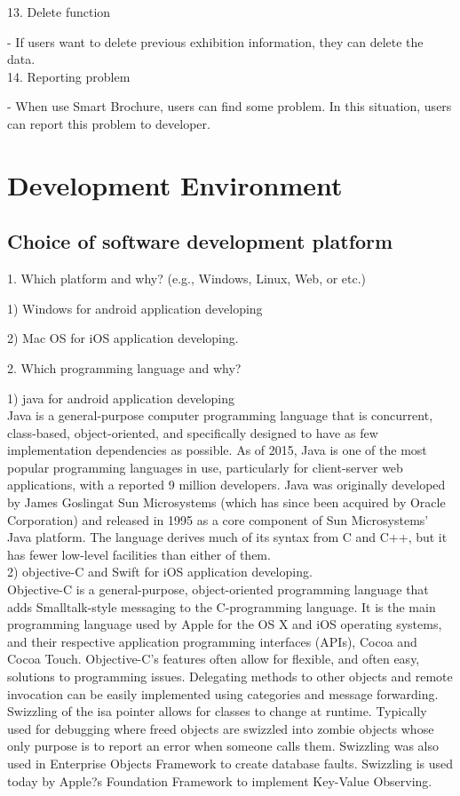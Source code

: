 \documentclass[conference]{IEEEtran}
\begin{document}
13. Delete function

\quad - If users want to delete previous exhibition information, they can delete the data.\\

14. Reporting problem

\quad - When use Smart Brochure, users can find some problem. In this situation, users can report this problem to developer.


\section{Development Environment}

\subsection{Choice of software development platform}
1. Which platform and why? (e.g., Windows, Linux, Web, or etc.) 

1) Windows for android application developing

2) Mac OS for iOS application developing.

2. Which programming language and why?

1) java for android application developing \\

Java is a general-purpose computer programming language that is concurrent, class-based, object-oriented, and specifically designed to have as few implementation dependencies as possible. As of 2015, Java is one of the most popular programming languages in use, particularly for client-server web applications, with a reported 9 million developers. Java was originally developed by James Goslingat Sun Microsystems (which has since been acquired by Oracle Corporation) and released in 1995 as a core component of Sun Microsystems' Java platform. The language derives much of its syntax from C and C++, but it has fewer low-level facilities than either of them.\\


2) objective-C and Swift for iOS application developing.\\
 Objective-C is a general-purpose, object-oriented programming language that adds Smalltalk-style messaging to the C-programming language. It is the main programming language used by Apple for the OS X and iOS operating systems, and their respective application programming interfaces (APIs), Cocoa and Cocoa Touch.
Objective-C's features often allow for flexible, and often easy, solutions to programming issues. Delegating methods to other objects and remote invocation can be easily implemented using categories and message forwarding. Swizzling of the isa pointer allows for classes to change at runtime. Typically used for debugging where freed objects are swizzled into zombie objects whose only purpose is to report an error when someone calls them. Swizzling was also used in Enterprise Objects Framework to create database faults. Swizzling is used today by Apple?s Foundation Framework to implement Key-Value Observing.\\
\end{document}
